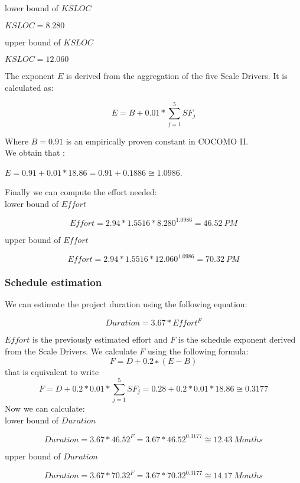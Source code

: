 lower bound of $ KSLOC $
\begin{center}
$KSLOC  = 8.280$
\end{center}

upper bound of $ KSLOC $
\begin{center}
$KSLOC = 12.060$
\end{center}
The exponent $E$ is derived from the aggregation of the five Scale Drivers. It is calculated as:
\begin{center}
$$ E = B + 0.01 * \sum_{j=1}^5 SF_j $$
\end{center}
Where $B = 0.91 $ is an empirically proven constant in COCOMO II.\\ We obtain that :
\begin{center}
$ E = 0.91 + 0.01 * 18.86 = 0.91 + 0.1886 \cong 1.0986 $.
\end{center}
\newpage
Finally we can compute the effort needed:\\

lower bound of $ Effort $
\begin{center}
$$ Effort = 2.94 * 1.5516 * 8.280^{1.0986} = 46.52~PM $$
\end{center}

upper bound of $ Effort $
\begin{center}
$$ Effort = 2.94 * 1.5516 * 12.060^{1.0986} = 70.32~PM $$
\end{center}

\subsubsection{Schedule estimation}

We can estimate the project duration using the following equation:
\begin{center}
$$ Duration = 3.67 * Effort^F $$
\end{center}
$Effort$ is the previously estimated effort and $F$ is the schedule exponent derived from the Scale Drivers.
We calculate $F$ using the following formula:
$$ F = D + 0. 2 ∗ (E − B) $$
that is equivalent to write 
$$ F = D + 0.2 * 0.01 * \sum_{j=1}^5 SF_j = 0.28 + 0.2 * 0.01 * 18.86 \cong 0.3177 $$
Now we can calculate:\\

lower bound of $ Duration $
\begin{center}
$$ Duration = 3.67 * 46.52^F = 3.67 * 46.52^{0.3177} \cong 12.43~Months $$
\end{center}

upper bound of $ Duration $
\begin{center}
$$ Duration = 3.67 * 70.32^F = 3.67 * 70.32^{0.3177} \cong 14.17~Months $$
\end{center}

